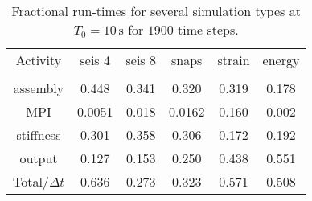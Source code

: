 \begin{table}[b!]
\begin{center}
\caption{Fractional run-times for several simulation types at $T_0=10\, \textrm{s}$
for $1900$ time steps.}
\label{table:runtimes}
\begin{tabular}{@{}cccccc}
&&&\\
\hline\hline
Activity & seis 4 & seis 8 & snaps & strain  & energy \\
\hline\\
assembly & 0.448 & 0.341& 0.320 & 0.319 & 0.178  \\[10pt]
MPI & 0.0051 &  0.018 & 0.0162 & 0.160 & 0.002 \\[10pt]
stiffness &0.301 & 0.358 & 0.306 &0.172 & 0.192  \\[10pt]
output & 0.127 & 0.153  & 0.250  &0.438 &  0.551 \\[10pt]
Total/$\Delta t$ & 0.636 & 0.273 &  0.323&  0.571 &  0.508\\ [10pt]
%
\hline
\end{tabular}
\end{center}
\end{table}
%
